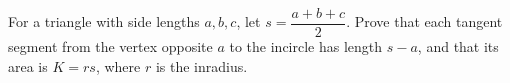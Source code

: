 For a triangle with side lengths $a,b,c$, let $s=\dfrac{a+b+c}{2}$. Prove that each tangent segment from the vertex opposite $a$ to the incircle has length $s-a$, and that its area is $K=rs$, where $r$ is the inradius.
